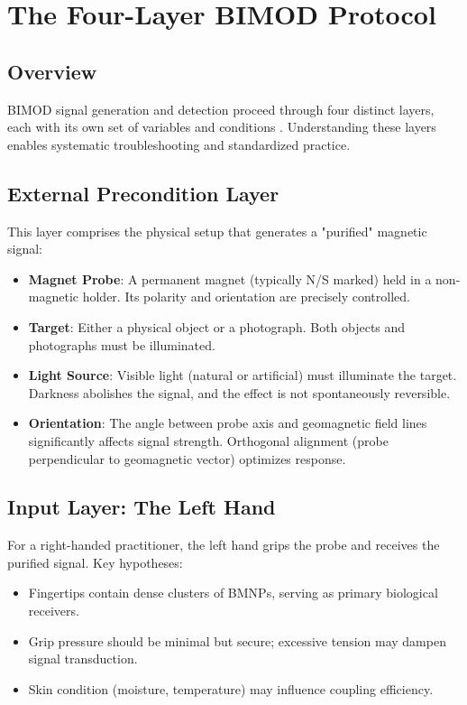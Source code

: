 \documentclass[12pt,a4paper]{article}
\begin{document}
\section{The Four-Layer BIMOD Protocol}

\subsection{Overview}

BIMOD signal generation and detection proceed through four distinct layers, each with its own set of variables and conditions \cite{yoon2026_004}. Understanding these layers enables systematic troubleshooting and standardized practice.

\subsection{External Precondition Layer}

This layer comprises the physical setup that generates a "purified" magnetic signal:

\begin{itemize}
    \item \textbf{Magnet Probe}: A permanent magnet (typically N/S marked) held in a non-magnetic holder. Its polarity and orientation are precisely controlled.
    \item \textbf{Target}: Either a physical object or a photograph. Both objects and photographs must be illuminated.
    \item \textbf{Light Source}: Visible light (natural or artificial) must illuminate the target. Darkness abolishes the signal, and the effect is not spontaneously reversible.
    \item \textbf{Orientation}: The angle between probe axis and geomagnetic field lines significantly affects signal strength. Orthogonal alignment (probe perpendicular to geomagnetic vector) optimizes response.
\end{itemize}

\subsection{Input Layer: The Left Hand}

For a right-handed practitioner, the left hand grips the probe and receives the purified signal. Key hypotheses:

\begin{itemize}
    \item Fingertips contain dense clusters of BMNPs, serving as primary biological receivers.
    \item Grip pressure should be minimal but secure; excessive tension may dampen signal transduction.
    \item Skin condition (moisture, temperature) may influence coupling efficiency.
\end{itemize}
\end{document}
